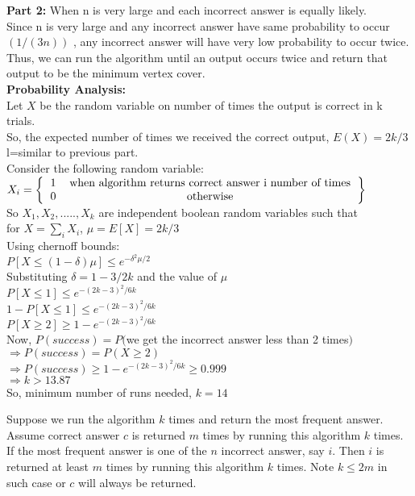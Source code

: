 \documentclass[11pt]{article}
\begin{document}
\textbf{Part 2:} When n is very large and each incorrect answer is equally likely. \\
Since n is very large and any incorrect answer have same probability to occur $(1/(3n))$ , any incorrect answer will have very
low probability to occur twice. Thus, we can run the algorithm until an output occurs twice and return that output to be the minimum 
vertex cover. \\
\textbf{Probability Analysis:} \\
Let $X$ be the random variable on number of times the output is correct in k trials.\\
So, the expected number of times we received the correct output, $E(X) = 2k/3$ l=similar to previous part.  \\
Consider the following random variable: \\
$X_i = \left \{
\begin{tabular}{cc}
1 & when algorithm returns correct answer i number of times \\
0 & otherwise
\end{tabular}
\right \}$ \\
So $X_1, X_2,.....,X_k$ are independent boolean random variables such that \\
for $X = \sum_{i} X_i$, $\mu = E[X] = 2k/3$ \\
Using chernoff bounds: \\
$P[X \leq (1-\delta)\mu] \leq e^{-\delta^2 \mu/2}$ \\
Substituting $\delta = 1-3/2k$ and the value of $\mu$ \\
$P[X \leq 1] \leq e^{-(2k-3)^2/6k}$ \\
$1 - P[X \leq 1] \leq e^{-(2k-3)^2/6k}$ \\
$P[X \geq 2] \geq 1 - e^{-(2k-3)^2/6k}$ \\
Now, $P(success) = P($we get the incorrect answer less than 2 times$)$ \\
$\Rightarrow P(success) = P(X \geq 2)$ \\
$\Rightarrow P(success) \geq 1 - e^{-(2k-3)^2/6k} \geq 0.999$ \\
$\Rightarrow k > 13.87$ \\
So, minimum number of runs needed, $k = 14$

\newpage

\newline


\noindent Suppose we run the algorithm $k$ times and return the most frequent answer.
Assume correct answer $c$ is returned $m$ times by running this algorithm $k$ times.
If the most frequent answer is one of the $n$ incorrect answer, say $i$.
Then $i$ is returned at least $m$ times by running this algorithm $k$ times.
Note $k \le 2m$ in such case or $c$ will always be returned.
\end{document}
